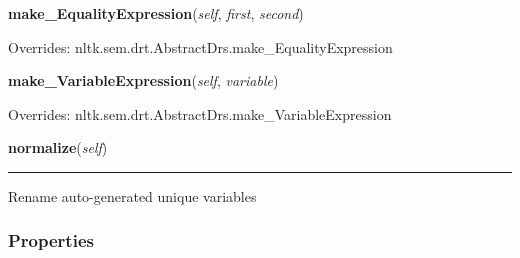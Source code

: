 \hspace{.8\funcindent}\begin{boxedminipage}{\funcwidth}

    \raggedright \textbf{make\_EqualityExpression}(\textit{self}, \textit{first}, \textit{second})

\setlength{\parskip}{2ex}
\setlength{\parskip}{1ex}
      Overrides: nltk.sem.drt.AbstractDrs.make\_EqualityExpression

    \end{boxedminipage}

    \vspace{0.5ex}

\hspace{.8\funcindent}\begin{boxedminipage}{\funcwidth}

    \raggedright \textbf{make\_VariableExpression}(\textit{self}, \textit{variable})

\setlength{\parskip}{2ex}
\setlength{\parskip}{1ex}
      Overrides: nltk.sem.drt.AbstractDrs.make\_VariableExpression

    \end{boxedminipage}

    \label{temporaldrt:AbstractDrs:normalize}

    \vspace{0.5ex}

\hspace{.8\funcindent}\begin{boxedminipage}{\funcwidth}

    \raggedright \textbf{normalize}(\textit{self})

    \vspace{-1.5ex}

    \rule{\textwidth}{0.5\fboxrule}
\setlength{\parskip}{2ex}
    Rename auto-generated unique variables

\setlength{\parskip}{1ex}
    \end{boxedminipage}



  \subsubsection{Properties}

